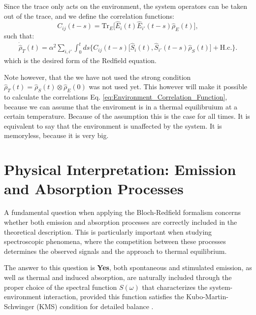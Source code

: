 Since the trace only acts on the environment, the system operators can be taken out of the trace, and we define the correlation functions:
\begin{equation}
    C_{ij}(t - s) = \mathrm{Tr}_E \big[\hat{E}_{i}(t) \hat{E}_{i'}(t-s) \hat{\rho}_E(t)\big],
    \label{eq:Environment_Correlation_Function}
\end{equation}
such that:
\begin{align}
    \dot{\hat{\rho}}_T(t) = \alpha^2  \sum_{i, i'} \int_0^t ds
    \bigg\{
    C_{ij}(t - s) \big[ \hat{S}_i(t),  \hat{S}_{i'}(t-s) \hat{\rho}_S(t) \big] + \text{H.c.}
    \bigg\}.
    \label{eq:Redfield_Equation_Final}
\end{align}
which is the desired form of the Redfield equation.

Note however, that the we have not used the strong condition $\hat{\rho}_T(t) = \hat{\rho}_S(t) \otimes \hat{\rho}_E(0)$ was not used yet.
This however will make it possible to calculate the correlations Eq. \eqref{eq:Environment_Correlation_Function}, because we can assume that the enviroment is in a thermal equilibruium at a certain temperature.
Because of the assumption this is the case for all times.
It is equivalent to say that the environment is unaffected by the system. It is memoryless, because it is very big.


\section{Physical Interpretation: Emission and Absorption Processes}
\label{sec:emission_absorption_kms}

\noindent A fundamental question when applying the Bloch-Redfield formalism concerns whether both emission and absorption processes are correctly included in the theoretical description. This is particularly important when studying spectroscopic phenomena, where the competition between these processes determines the observed signals and the approach to thermal equilibrium.

\noindent The answer to this question is \textbf{Yes}, both spontaneous and stimulated emission, as well as thermal and induced absorption, are naturally included through the proper choice of the spectral function $S(\omega)$ that characterizes the system-environment interaction, provided this function satisfies the Kubo-Martin-Schwinger (KMS) condition for detailed balance \cite{MartinSchwinger1959TheoryManyparticleSystems, Sewell2020QuantumMechanicsIts}.

